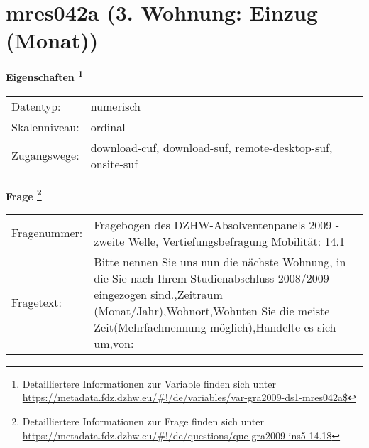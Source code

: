 
    \setcounter{footnote}{0}

    \vspace*{-1.8cm}
	\section{mres042a (3. Wohnung: Einzug (Monat))}
	\label{section:mres042a}



    \vspace*{0.5cm}
    \noindent\textbf{Eigenschaften
	\footnote{Detailliertere Informationen zur Variable finden sich unter
		\url{https://metadata.fdz.dzhw.eu/\#!/de/variables/var-gra2009-ds1-mres042a$}}}\\
	\begin{tabularx}{\hsize}{@{}lX}
	Datentyp: & numerisch \\
	Skalenniveau: & ordinal \\
	Zugangswege: &
	  download-cuf, 
	  download-suf, 
	  remote-desktop-suf, 
	  onsite-suf
 \\
    \end{tabularx}



				\vspace*{0.5cm}
                \noindent\textbf{Frage
	                \footnote{Detailliertere Informationen zur Frage finden sich unter
		              \url{https://metadata.fdz.dzhw.eu/\#!/de/questions/que-gra2009-ins5-14.1$}}}\\
				\begin{tabularx}{\hsize}{@{}lX}
					Fragenummer: &
					  Fragebogen des DZHW-Absolventenpanels 2009 - zweite Welle, Vertiefungsbefragung Mobilität:
					  14.1
 \\
					Fragetext: & Bitte nennen Sie uns nun die nächste Wohnung, in die Sie nach Ihrem Studienabschluss 2008/2009 eingezogen sind.,Zeitraum (Monat/Jahr),Wohnort,Wohnten Sie die meiste Zeit(Mehrfachnennung möglich),Handelte es sich um,von: \\
				\end{tabularx}





